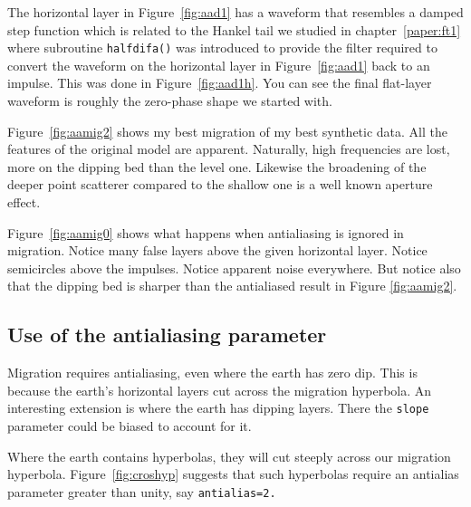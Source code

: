 \par
The horizontal layer in Figure~\ref{fig:aad1}
has a waveform that resembles a damped step function
which is related to the Hankel tail we studied in chapter~\ref{paper:ft1}
where subroutine \texttt{halfdifa()}  was introduced
to provide the filter required to convert
the waveform on the  horizontal layer in Figure~\ref{fig:aad1} back to an impulse.
This was done in Figure~\ref{fig:aad1h}.
You can see the final flat-layer waveform
is roughly the zero-phase shape we started with.

Figure~\ref{fig:aamig2} shows my best migration of my best synthetic data.
All the features of the original model are apparent.
Naturally, high frequencies are lost,
more on the dipping bed than the level one.  
Likewise the broadening of the deeper point scatterer compared
to the shallow one is a well known aperture effect.


Figure~\ref{fig:aamig0} shows what happens when antialiasing
is ignored in migration.
Notice many false layers above the given horizontal layer.
Notice semicircles above the impulses.
Notice apparent noise everywhere.
But notice also that the dipping bed is sharper
than the antialiased result in Figure \ref{fig:aamig2}.

\subsection{Use of the antialiasing parameter}

\par
Migration requires antialiasing, even where the earth has zero dip.
This is because the earth's horizontal layers
cut across the migration hyperbola.
An interesting extension is where the earth has dipping layers.
There the {\tt slope} parameter could be biased to account for it.
\par
Where the earth contains hyperbolas,
they will cut steeply across our migration hyperbola.
Figure~\ref{fig:croshyp} suggests
that such hyperbolas require
an antialias parameter greater than unity, say {\tt antialias=2.}

